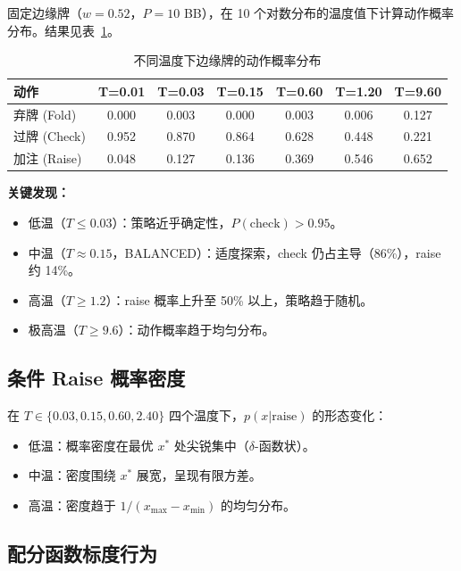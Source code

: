 \documentclass[12pt,a4paper]{ctexart}
\begin{document}
固定边缘牌（$w=0.52$，$P=10$ BB），在 10 个对数分布的温度值下计算动作概率分布。结果见表~\ref{tab:action_probs}。

\begin{table}[H]
\centering
\caption{不同温度下边缘牌的动作概率分布}
\label{tab:action_probs}
\begin{tabular}{@{}lcccccc@{}}
\toprule
\textbf{动作} & \textbf{T=0.01} & \textbf{T=0.03} & \textbf{T=0.15} & \textbf{T=0.60} & \textbf{T=1.20} & \textbf{T=9.60} \\
\midrule
弃牌 (Fold)  & 0.000 & 0.003 & 0.000 & 0.003 & 0.006 & 0.127 \\
过牌 (Check) & 0.952 & 0.870 & 0.864 & 0.628 & 0.448 & 0.221 \\
加注 (Raise) & 0.048 & 0.127 & 0.136 & 0.369 & 0.546 & 0.652 \\
\bottomrule
\end{tabular}
\end{table}

\textbf{关键发现：}
\begin{itemize}
    \item 低温（$T \le 0.03$）：策略近乎确定性，$P(\text{check}) > 0.95$。
    \item 中温（$T \approx 0.15$，BALANCED）：适度探索，check 仍占主导（86\%），raise 约 14\%。
    \item 高温（$T \ge 1.2$）：raise 概率上升至 50\% 以上，策略趋于随机。
    \item 极高温（$T \ge 9.6$）：动作概率趋于均匀分布。
\end{itemize}

\subsection{条件 Raise 概率密度}

在 $T \in \{0.03, 0.15, 0.60, 2.40\}$ 四个温度下，$p(x|\text{raise})$ 的形态变化：
\begin{itemize}
    \item 低温：概率密度在最优 $x^*$ 处尖锐集中（$\delta$-函数状）。
    \item 中温：密度围绕 $x^*$ 展宽，呈现有限方差。
    \item 高温：密度趋于 $1/(x_{\max}-x_{\min})$ 的均匀分布。
\end{itemize}

\subsection{配分函数标度行为}
\end{document}
